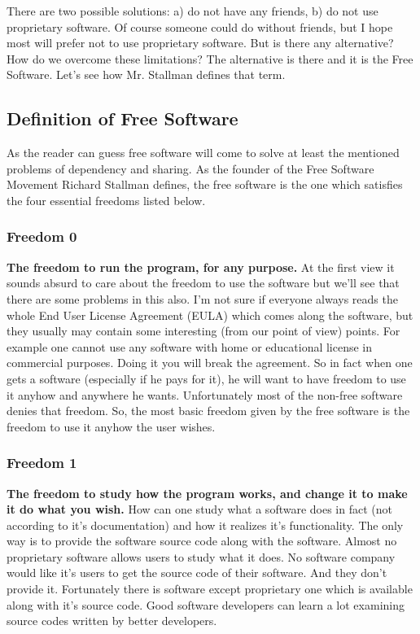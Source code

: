 There are two possible solutions: a) do not have any friends, b) do not use proprietary software. Of course someone could do without friends, but I hope most will prefer not to use proprietary software. But is there any alternative? How do we overcome these limitations? The alternative is there and it is the Free Software. Let's see how Mr. Stallman defines that term.

\subsection{Definition of Free Software}
As the reader can guess free software will come to solve at least the mentioned problems of dependency and sharing. As the founder of the Free Software Movement Richard Stallman defines, the free software is the one which satisfies the four essential freedoms listed below.

\subsubsection{Freedom 0}
\textbf{The freedom to run the program, for any purpose.} At the first view it sounds absurd to care about the freedom to use the software but we'll see that there are some problems in this also. I'm not sure if everyone always reads the whole End User License Agreement (EULA) which comes along the software, but they usually may contain some interesting (from our point of view) points. For example one cannot use any software with home or educational license in commercial purposes. Doing it you will break the agreement. So in fact when one gets a software (especially if he pays for it), he will want to have freedom to use it anyhow and anywhere he wants. Unfortunately most of the non-free software denies that freedom. So, the most basic freedom given by the free software is the freedom to use it anyhow the user wishes.

\subsubsection{Freedom 1}
\textbf{The freedom to study how the program works, and change it to make it do what you wish.} How can one study what a software does in fact (not according to it's documentation) and how it realizes it's functionality. The only way is to provide the software source code along with the software. Almost no proprietary software allows users to study what it does. No software company would like it's users to get the source code of their software. And they don't provide it. Fortunately there is software except proprietary one which is available along with it's source code. Good software developers can learn a lot examining source codes written by better developers.

